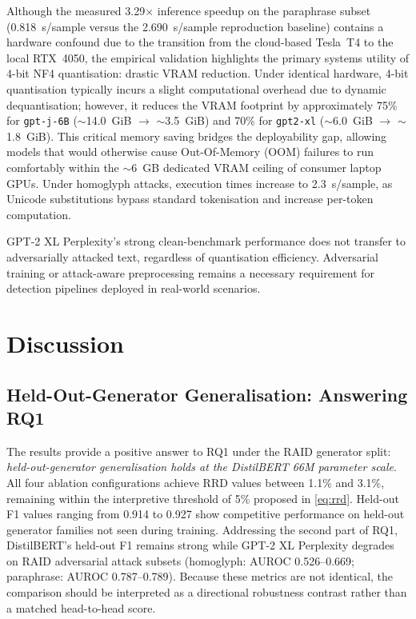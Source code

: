 \documentclass[conference]{IEEEtran}
\begin{document}
Although the measured 3.29$\times$ inference speedup on the paraphrase subset 
(0.818~s/sample versus the 2.690~s/sample reproduction baseline) contains a hardware 
confound due to the transition from the cloud-based Tesla~T4 to the local RTX~4050, 
the empirical validation highlights the primary systems utility of 4-bit NF4 quantisation: 
drastic VRAM reduction. Under identical hardware, 4-bit quantisation typically incurs 
a slight computational overhead due to dynamic dequantisation; however, it reduces the VRAM 
footprint by approximately 75\% for \texttt{gpt-j-6B} ($\sim$14.0~GiB $\rightarrow$ $\sim$3.5~GiB) 
and 70\% for \texttt{gpt2-xl} ($\sim$6.0~GiB $\rightarrow$ $\sim$1.8~GiB). This critical memory saving 
bridges the deployability gap, allowing models that would otherwise cause Out-Of-Memory (OOM) 
failures to run comfortably within the $\sim$6~GB dedicated VRAM ceiling of consumer laptop GPUs. 
Under homoglyph attacks, execution times increase to 2.3~s/sample, as Unicode substitutions
bypass standard tokenisation and increase per-token computation.

GPT-2 XL Perplexity's strong clean-benchmark performance does not transfer to
adversarially attacked text, regardless of quantisation efficiency.
Adversarial training or attack-aware preprocessing remains a necessary
requirement for detection pipelines deployed in real-world scenarios.

\section{Discussion}\label{sec:discussion}

\subsection{Held-Out-Generator Generalisation: Answering RQ1}\label{ssec:rq1}

The results provide a positive answer to RQ1 under the RAID generator split:
\emph{held-out-generator generalisation holds at the DistilBERT 66M parameter
scale}. All four ablation configurations achieve RRD values between 1.1\% and
3.1\%, remaining within the interpretive threshold of 5\% proposed in
\eqref{eq:rrd}. Held-out F1 values ranging from 0.914 to 0.927 show
competitive performance on held-out generator families not seen during training.
Addressing the second part of RQ1, DistilBERT's held-out F1 remains strong
while GPT-2 XL Perplexity degrades on RAID adversarial attack subsets (homoglyph:
AUROC 0.526--0.669; paraphrase: AUROC 0.787--0.789). Because these metrics
are not identical, the comparison should be interpreted as a directional
robustness contrast rather than a matched head-to-head score.
\end{document}
